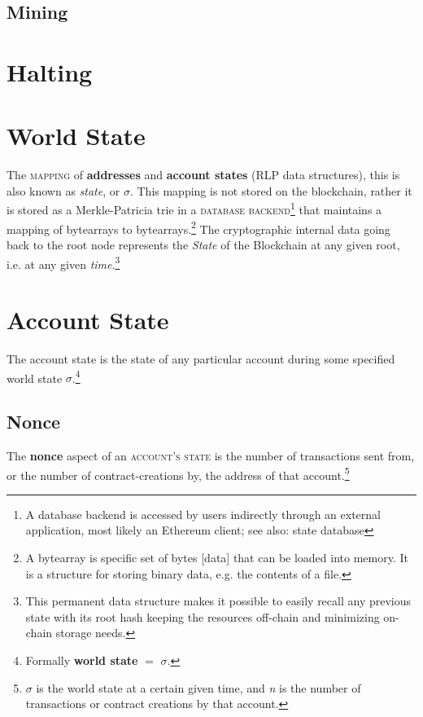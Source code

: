 \documentclass[11pt,a4paper,leqno,bibliography=totoc]{scrartcl}
\newenvironment{alphafootnotes}
{\par\edef\savedfootnotenumber{\number\value{footnote}}
\renewcommand{\thefootnote}{\alph{footnote}}
\setcounter{footnote}{0}}
{\par\setcounter{footnote}{\savedfootnotenumber}}
\begin{document}
\begin{alphafootnotes}
\begin{multicols*}{2}
    \subsection{Mining}


    \section{Halting}
  \section{World State}



The \textsc{mapping} of \textbf{addresses} and \textbf{account states} (RLP data structures), this is also known as \textit{state}, or $\sigma$. This mapping is not stored on the blockchain, rather it is stored as a Merkle-Patricia \gls{trie} in a \textsc{database backend}\footnote{A database backend is accessed by users indirectly through an external application, most likely an Ethereum client; see also: \gls{state database}} that maintains a mapping of bytearrays to bytearrays.\footnote{A bytearray is specific set of bytes [data] that can be loaded into memory. It is a structure for storing binary data, e.g. the contents of a file.} The cryptographic internal data going back to the \gls{root node} represents the \textit{State} of the Blockchain at any given root, i.e. at any given \textit{time}.\footnote{This permanent data structure makes it possible to easily recall any previous state with its root hash keeping the resources off-chain and minimizing on-chain storage needs.}

    \section{Account State}

    The account state is the state of any particular account during some specified world state $\sigma$.\footnote{Formally \textbf{world state} $=$ $\sigma$.} \par

    		\subsection{Nonce} The \textbf{nonce} aspect of an \textsc{account's state} is the number of transactions sent from, or the number of contract-creations by, the address of that account.\footnote{$\sigma$ is the world state at a certain given time, and \textit{n} is the number of transactions or contract creations by that account.}

\end{multicols*}
\end{alphafootnotes}
\end{document}
